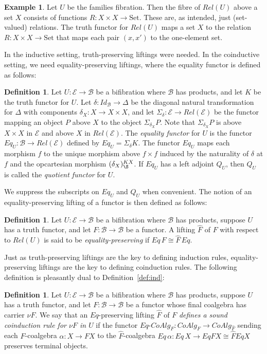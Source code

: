 \documentclass{LMCS}
\newcommand{\ra}{\rightarrow}
\newcommand{\Set}{\mbox{Set}}
\newcommand\E{{\mathcal E}}
\newcommand\B{{\mathcal B}}
\newcommand\coalg{\mathit{CoAlg}}
\newcommand\dcoalg{\mbox{-}\!\coalg}
\theoremstyle{plain}
\theoremstyle{remark}
\theoremstyle{definition}
\newtheorem{definition}[theorem]{Definition}
\newtheorem{example}[theorem]{Example}
\begin{document}
\begin{example}
Let $U$ be the families fibration. Then the fibre of $Rel(U)$ above a
set $X$ consists of functions $R:X \times X \ra \Set$. These are, as
intended, just (set-valued) relations. The truth functor for $Rel(U)$
maps a set $X$ to the relation $R : X \times X \ra \Set$ that maps
each pair $(x,x')$ to the one-element set.
\end{example}

In the inductive setting, truth-preserving liftings were needed. In
the coinductive setting, we need equality-preserving liftings, where
the equality functor is defined as follows:

\begin{definition}\label{def:eq-fun}
  Let $U:\E \ra \B$ be a bifibration where $\B$ has products, and let
  $K$ be the truth functor for $U$. Let $\delta: \mathit{Id}_\B \ra
  \Delta$ be the diagonal natural transformation for $\Delta$ with
  components $\delta_X: X \ra X \times X$, and let $\Sigma_{\delta} :
  \E \ra Rel(\E)$ be the functor mapping an object $P$ above $X$ to
  the object $\Sigma_{\delta_X} P$. Note that $\Sigma_{\delta_X} P$ is
  above $X \times X$ in $\E$ and above $X$ in $Rel(\E)$. The {\em
    equality functor} for $U$ is the functor $Eq_U : \B \ra Rel(\E)$
  defined by $Eq_U = \Sigma_{\delta} K$. The functor $Eq_U$ maps each
  morphism $f$ to the unique morphism above $f \times f$ induced by
  the naturality of $\delta$ at $f$ and the opcartesian morphism
  $(\delta_X)_{\S}^{KX}$. If $Eq_U$ has a left adjoint $Q_U$, then $Q_U$
  is called the {\em quotient functor} for $U$.
\end{definition}
\noindent
We suppress the subscripts on $Eq_U$ and $Q_U$ when convenient. The
notion of an equality-preserving lifting of a functor is then defined
as follows:

\begin{definition}
  Let $U:\E \ra \B$ be a bifibration where $\B$ has products, suppose
  $U$ has a truth functor, and let $F:\B \ra \B$ be a functor. A
  lifting $\hat{F}$ of $F$ with respect to $Rel(U)$ is said to be
  {\em equality-preserving} if $Eq\, F \cong \hat{F}\, Eq$.
\end{definition}

Just as truth-preserving liftings are the key to defining induction
rules, equality-preserving liftings are the key to defining
coinduction rules. The following definition is pleasantly dual to
Definition~\ref{def:ind}:

\begin{definition}\label{def:coind}
  Let $U:\E\to\B$ be a bifibration where $\B$ has products, suppose
  $U$ has a truth functor, and let $F:\B\to\B$ be a functor whose
  final coalgebra has carrier $\nu F$. We say that an $Eq$-preserving
  lifting $\hat F$ of $F$ \emph{defines a sound coinduction rule for
    $\nu F$ in $U$} if the functor $Eq\dcoalg_F:\coalg_F\to\coalg_{\hat
    F}$ sending each $F$-coalgebra $\alpha : X \rightarrow F X$ to the
  $\hat F$-coalgebra $Eq\,\alpha : Eq \,X \ra Eq F X \cong \hat F Eq
  X$ preserves terminal objects.
\end{definition}
\end{document}
